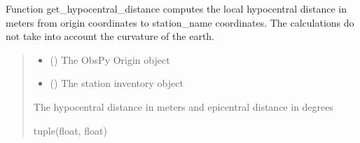 \documentclass[letterpaper,10pt,english]{sphinxmanual}
\begin{document}

\begin{fulllineitems}
\label{\detokenize{api_core:amw.core.utils.get_hypocentral_distance}}
\pysigstartsignatures
{}
\pysigstopsignatures
\sphinxAtStartPar
Function get\_hypocentral\_distance computes the local hypocentral distance in meters
from origin coordinates to station\_name coordinates.
The calculations do not take into account the curvature of the earth.
\begin{quote}\begin{description}
\begin{itemize}
\item {} 
\sphinxAtStartPar
{} () \textendash{} The ObsPy Origin object

\item {} 
\sphinxAtStartPar
{} () \textendash{} The station inventory object

\end{itemize}

\sphinxAtStartPar
The hypocentral distance in meters and epicentral distance in degrees

\sphinxAtStartPar
tuple(float, float)

\end{description}\end{quote}

\end{fulllineitems}

\end{document}
